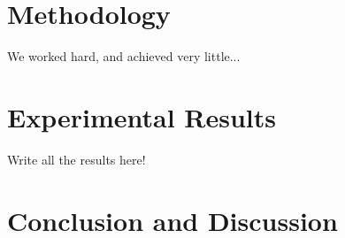 \documentclass[10pt]{article}
\begin{document}
\section{Methodology}\label{sec:4}
We worked hard, and achieved very little...

\newpage

\section{Experimental Results}\label{sec:5}

Write all the results here!

\section{Conclusion and Discussion}\label{sec:6}


\end{document}
